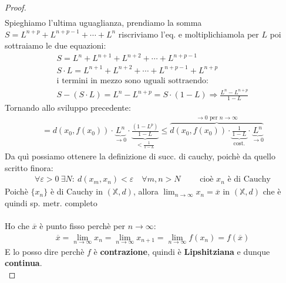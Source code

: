 \documentclass[a4paper, oneside]{article}
\newcommand\X{\mathbb{X}}
\begin{document}
\begin{theorem}
\begin{proof}
\begin{gather*}
        \end{gather*}
        Spieghiamo l'ultima uguaglianza, prendiamo la somma $ S = L^{n+p} + L^{n+p-1} + \cdots + L^n$ riscriviamo l'eq. e moltiplichiamola per $L$ poi sottraiamo le due equazioni:
        \begin{gather*}
            S = L^n + L^{n+1} + L^{n+2} + \cdots + L^{n+p-1} \\
            S \cdot L = L^{n+1} + L^{n+2} + \cdots + L^{n+p-1} + L^{n+p} \\
            \text{i termini in mezzo sono uguali sottraendo:}\\
            S -( S \cdot L) = L^n - L^{n+p} = S \cdot (1-L) \Rightarrow \frac{L^n - L^{n+p}}{1-L}
        \end{gather*}
        Tornando allo sviluppo precedente:
        \begin{gather*}
            = d(x_0,f(x_0)) \cdot \underbrace{L^n}_{\to 0} \cdot \underbrace{\frac{\left(1-L^p\right)}{1-L}}_{<\frac{1}{1-L}} \leq \overbrace{d(x_0,f(x_0)) \cdot \underbrace{\frac{1}{1-L}}_{\text{cost.}} \cdot \underbrace{L^n}_{\to 0}}^{\to 0 \text{ per } n \to \infty}
        \end{gather*}
        Da quì possiamo ottenere la definizione di succ. di cauchy, poichè da quello scritto finora:
        \begin{gather*}
            \forall \varepsilon > 0 \ \exists N: \ d(x_m,x_n) < \varepsilon \quad \forall m,n > N \qquad \text{ cioè } {x_n} \text{ è di Cauchy}
        \end{gather*}
        Poichè $\{x_n\}$ è di Cauchy in $(\X,d)$, allora $\lim_{n \to \infty} x_n = \overline{x}$ in $(\X,d)$ che è quindi sp. metr. completo\\\\
        Ho che $\overline{x}$ è punto fisso perchè per $n \to \infty$:
        \begin{gather*}
            \overline{x} = \lim_{n\to\infty} x_n = \lim_{n\to\infty} x_{n+1} = \lim_{n\to\infty} f(x_n) = f(\overline{x})
        \end{gather*}
        E lo posso dire perchè $f$ è \textbf{contrazione}, quindi è \textbf{Lipshitziana} e dunque \textbf{continua}.\\

\end{proof}
\end{theorem}
\end{document}
